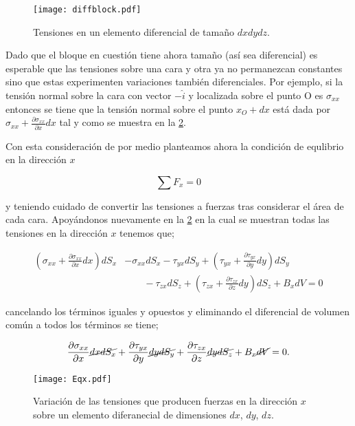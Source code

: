 \documentclass[../notas medios.tex]{subfiles}
\begin{document}
\begin{figure}[H]
\centering
	\texttt{[image: diffblock.pdf]}
	\caption{Tensiones en un elemento diferencial de tamaño $dxdydz$.}
	\label{diff}
\end{figure}

Dado que el bloque en cuestión tiene ahora tamaño (así sea diferencial) es esperable que las tensiones sobre una cara y otra ya no permanezcan constantes sino que estas experimenten variaciones también diferenciales. Por ejemplo, si la tensión normal sobre la cara con vector $-\hat{i}$ y localizada sobre el punto O es ${\sigma _{xx}}$ entonces se tiene que la tensión normal sobre el punto $x_O+dx$ está dada por ${\sigma _{xx}} + \frac{{\partial {\sigma _{xx}}}}{{\partial x}}dx$ tal y como se muestra en la \cref{EQx}.


Con esta consideración de por medio planteamos ahora la condición de equlibrio en la dirección $x$

\[\sum {{F_x} = 0} \]

y teniendo cuidado de convertir las tensiones a fuerzas tras considerar el área de cada cara. Apoyándonos nuevamente en la \cref{EQx} en la cual se muestran todas las tensiones en la dirección $x$ tenemos que;


\begin{align*}
\left( {{\sigma _{xx}} + \frac{{\partial {\sigma _{xx}}}}{{\partial x}}dx} \right)d{S_x} & - {\sigma _{xx}}d{S_x} - {\tau _{yx}}d{S_y} + \left( {{\tau _{yx}} + \frac{{\partial {\tau _{yx}}}}{{\partial y}}dy} \right)d{S_y} \nonumber \\ 
&\qquad {} - {\tau _{zx}}d{S_z} + \left( {{\tau _{zx}} + \frac{{\partial {\tau _{zx}}}}{{\partial z}}dy} \right)d{S_z} + {B_x}dV = 0
\end{align*}


cancelando los términos iguales y opuestos y eliminando el diferencial de volumen común a todos los términos se tiene;


\[\frac{{\partial {\sigma _{xx}}}}{{\partial x}}\cancel{dxd{S_x}} + \frac{{\partial {\tau _{yx}}}}{{\partial y}}\cancel{dyd{S_y}} + \frac{{\partial {\tau _{zx}}}}{{\partial z}}\cancel{dyd{S_z}} + {B_x}\cancel{dV} = 0.\]

\begin{figure}[H]
\centering
	\texttt{[image: Eqx.pdf]}
	\caption{Variación de las tensiones que producen fuerzas en la dirección $x$ sobre un elemento diferanecial de dimensiones $dx$, $dy$, $dz$.}
	\label{EQx}
\end{figure}
\end{document}
